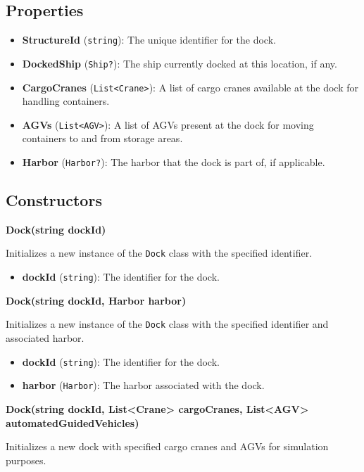 \documentclass[12pt]{article}
\begin{document}
\subsection*{Properties}

\begin{itemize}
    \item \textbf{StructureId} (\texttt{string}): The unique identifier for the dock.
    \item \textbf{DockedShip} (\texttt{Ship?}): The ship currently docked at this location, if any.
    \item \textbf{CargoCranes} (\texttt{List<Crane>}): A list of cargo cranes available at the dock for handling containers.
    \item \textbf{AGVs} (\texttt{List<AGV>}): A list of AGVs present at the dock for moving containers to and from storage areas.
    \item \textbf{Harbor} (\texttt{Harbor?}): The harbor that the dock is part of, if applicable.
\end{itemize}

\subsection*{Constructors}

\textbf{Dock(string dockId)}

Initializes a new instance of the \texttt{Dock} class with the specified identifier.

\begin{itemize}
    \item \textbf{dockId} (\texttt{string}): The identifier for the dock.
\end{itemize}

\textbf{Dock(string dockId, Harbor harbor)}

Initializes a new instance of the \texttt{Dock} class with the specified identifier and associated harbor.

\begin{itemize}
    \item \textbf{dockId} (\texttt{string}): The identifier for the dock.
    \item \textbf{harbor} (\texttt{Harbor}): The harbor associated with the dock.
\end{itemize}

\textbf{Dock(string dockId, List<Crane> cargoCranes, List<AGV> automatedGuidedVehicles)}

Initializes a new dock with specified cargo cranes and AGVs for simulation purposes.
\end{document}
